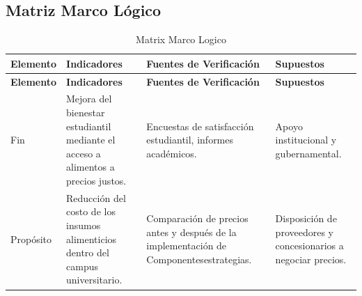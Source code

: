 \documentclass[letterpaper, 11pt]{report}
\begin{document}
\subsection{Matriz Marco Lógico}

\begin{longtable}{|p{.2\linewidth}|p{.2\linewidth}|p{.3\linewidth}|p{.2\linewidth}|}
      \caption{Matrix Marco Logico}                                                                                                                                                                                   \\
      \hline
      \textbf{Elemento}                                                           & \textbf{Indicadores}                                                      & \textbf{Fuentes de Verificación} & \textbf{Supuestos} \\
      \hline
      \endfirsthead

      \hline
      \textbf{Elemento}                                                           & \textbf{Indicadores}                                                      & \textbf{Fuentes de Verificación} & \textbf{Supuestos} \\
      \hline
      \endhead

      \hline
      \endfoot

      \hline
      \endlastfoot

      Fin                                                                         & Mejora del bienestar estudiantil mediante el acceso a alimentos a precios
      justos.                                                                     & Encuestas de satisfacción estudiantil, informes académicos.               & Apoyo
      institucional y gubernamental.                                                                                                                                                                                  \\\hline

      Propósito                                                                   & Reducción del costo de los insumos alimenticios dentro del campus
      universitario.                                                              & Comparación de precios antes y después de la implementación de
      Componentesestrategias.                                                     & Disposición de proveedores y concesionarios a
      negociar precios.                                                                                                                                                                                               \\\hline


\end{longtable}
\end{document}
